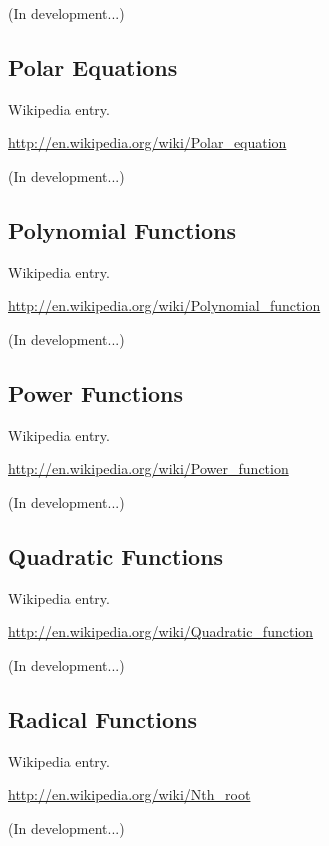 \documentclass[12pt,twoside]{book}
\begin{document}
(In development...)

\subsection[Polar Equations]{Polar Equations}

Wikipedia entry.

\href{http://en.wikipedia.org/wiki/Polar_equation}{http://en.wikipedia.org/wiki/Polar\_equation}

(In development...)

\subsection[Polynomial Functions]{Polynomial Functions}

Wikipedia entry.

\href{http://en.wikipedia.org/wiki/Polynomial_function}{http://en.wikipedia.org/wiki/Polynomial\_function}

(In development...)

\subsection[Power Functions]{Power Functions}

Wikipedia entry.

\href{http://en.wikipedia.org/wiki/Power_function}{http://en.wikipedia.org/wiki/Power\_function}

(In development...)

\subsection[Quadratic Functions]{Quadratic Functions}

Wikipedia entry.

\href{http://en.wikipedia.org/wiki/Quadratic_function}{http://en.wikipedia.org/wiki/Quadratic\_function}

(In development...)

\subsection[Radical Functions]{Radical Functions}

Wikipedia entry.

\href{http://en.wikipedia.org/wiki/Nth_root}{http://en.wikipedia.org/wiki/Nth\_root}

(In development...)
\end{document}
